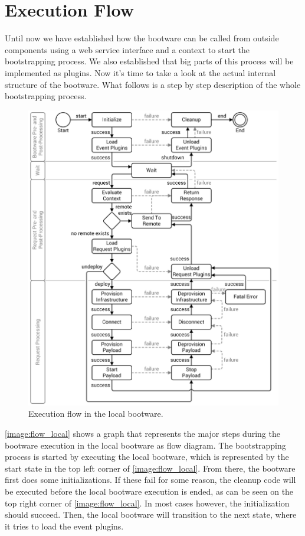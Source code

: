 \section{Execution Flow}
\label{design:flow}

Until now we have established how the bootware can be called from outside components using a web service interface and a context to start the bootstrapping process.
We also established that big parts of this process will be implemented as plugins.
Now it's time to take a look at the actual internal structure of the bootware.
What follows is a step by step description of the whole bootstrapping process.

\begin{figure}[!htbp]
	\centering
	\includegraphics[resolution=600]{design/assets/flow_local}
	\caption{Execution flow in the local bootware.}
	\label{image:flow_local}
\end{figure}

\autoref{image:flow_local} shows a graph that represents the major steps during the bootware execution in the local bootware as flow diagram.
The bootstrapping process is started by executing the local bootware, which is represented by the start state in the top left corner of \autoref{image:flow_local}.
From there, the bootware first does some initializations.
If these fail for some reason, the cleanup code will be executed before the local bootware execution is ended, as can be seen on the top right corner of \autoref{image:flow_local}.
In most cases however, the initialization should succeed.
Then, the local bootware will transition to the next state, where it tries to load the event plugins.

